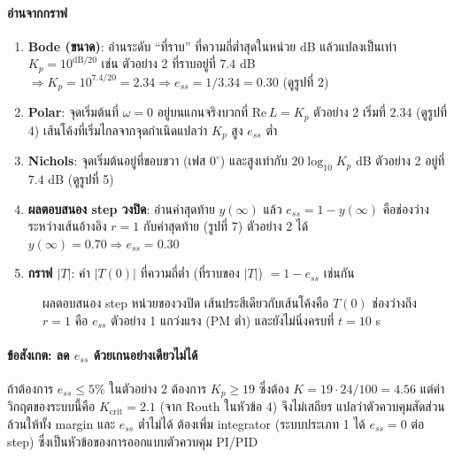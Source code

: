 \documentclass[12pt,a4paper]{article}
\begin{document}
\paragraph{อ่านจากกราฟ}
\begin{enumerate}[leftmargin=1.6em,itemsep=2pt]
\item \textbf{Bode (ขนาด)}: อ่านระดับ ``ที่ราบ'' ที่ความถี่ต่ำสุดในหน่วย dB แล้วแปลงเป็นเท่า $K_p=10^{\mathrm{dB}/20}$ เช่น ตัวอย่าง 2 ที่ราบอยู่ที่ $7.4$ dB $\Rightarrow K_p=10^{7.4/20}=2.34\Rightarrow e_{ss}=1/3.34=0.30$ (ดูรูปที่ 2)
\item \textbf{Polar}: จุดเริ่มต้นที่ $\omega=0$ อยู่บนแกนจริงบวกที่ $\mathrm{Re}\,L=K_p$ ตัวอย่าง 2 เริ่มที่ $2.34$ (ดูรูปที่ 4) เส้นโค้งที่เริ่มไกลจากจุดกำเนิดแปลว่า $K_p$ สูง $e_{ss}$ ต่ำ
\item \textbf{Nichols}: จุดเริ่มต้นอยู่ที่ขอบขวา (เฟส $0^\circ$) และสูงเท่ากับ $20\log_{10}K_p$ dB ตัวอย่าง 2 อยู่ที่ $7.4$ dB (ดูรูปที่ 5)
\item \textbf{ผลตอบสนอง step วงปิด}: อ่านค่าสุดท้าย $y(\infty)$ แล้ว $e_{ss}=1-y(\infty)$ คือช่องว่างระหว่างเส้นอ้างอิง $r=1$ กับค่าสุดท้าย (รูปที่ 7) ตัวอย่าง 2 ได้ $y(\infty)=0.70\Rightarrow e_{ss}=0.30$
\item \textbf{กราฟ $|T|$}: ค่า $|T(0)|$ ที่ความถี่ต่ำ (ที่ราบของ $|T|$) $=1-e_{ss}$ เช่นกัน
\end{enumerate}

\begin{figure}[h]
\centering

\caption{ผลตอบสนอง step หน่วยของวงปิด เส้นประสีเดียวกับเส้นโค้งคือ $T(0)$ ช่องว่างถึง $r=1$ คือ $e_{ss}$ ตัวอย่าง 1 แกว่งแรง (PM ต่ำ) และยังไม่นิ่งครบที่ $t=10$ s}
\end{figure}

\paragraph{ข้อสังเกต: ลด $e_{ss}$ ด้วยเกนอย่างเดียวไม่ได้}
ถ้าต้องการ $e_{ss}\le5\%$ ในตัวอย่าง 2 ต้องการ $K_p\ge19$ ซึ่งต้อง $K=19\cdot24/100=4.56$ แต่ค่าวิกฤตของระบบนี้คือ $K_{\text{crit}}=2.1$ (จาก Routh ในหัวข้อ 4) จึงไม่เสถียร แปลว่าตัวควบคุมสัดส่วนล้วนให้ทั้ง margin และ $e_{ss}$ ต่ำไม่ได้ ต้องเพิ่ม integrator (ระบบประเภท 1 ได้ $e_{ss}=0$ ต่อ step) ซึ่งเป็นหัวข้อของการออกแบบตัวควบคุม PI/PID
\end{document}
